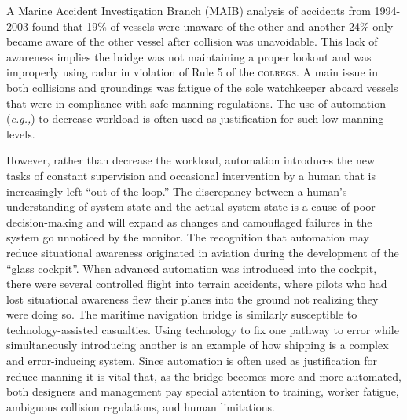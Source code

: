 \documentclass[twoside,symmetric,notoc]{tufte-book}
\newcommand{\hairsp}{\hspace{1pt}}
\newcommand{\eg}{\textit{e.\hairsp{}g.,}\hspace{3pt}}
\begin{document}
\newpage
\par{%
A Marine Accident Investigation Branch (MAIB) analysis of accidents from 1994-2003 found that 19\% of vessels were unaware of the other and another 24\% only became aware of the other vessel after collision was unavoidable. This lack of awareness implies the bridge was not maintaining a proper lookout and was improperly using radar in violation of Rule 5 of the \textsc{colregs}. A main issue in both collisions and groundings was fatigue of the sole watchkeeper aboard vessels that were in compliance with safe manning regulations.\cite{MAIB_2004} The use of automation (\eg{radar, automatic radar plotting aid, automatic identification system, electronic chart display and information system, autopilot}) to decrease workload is often used as justification for such low manning levels.
}
\par{%
However, rather than decrease the workload, automation introduces the new tasks of constant supervision and occasional intervention by a human that is increasingly left ``out-of-the-loop.'' The discrepancy between a human's understanding of system state and the actual system state is a cause of poor decision-making and will expand as changes and camouflaged failures in the system go unnoticed by the monitor.\cite{Woods_1988} The recognition that automation may reduce situational awareness originated in aviation during the development of the ``glass cockpit''. When advanced automation was introduced into the cockpit, there were several controlled flight into terrain accidents, where pilots who had lost situational awareness flew their planes into the ground not realizing they were doing so.\cite{Ishibash} The maritime navigation bridge is similarly susceptible to technology-assisted casualties. Using technology to fix one pathway to error while simultaneously introducing another is an example of how shipping is a complex and error-inducing system. Since automation is often used as justification for reduce manning it is vital that, as the bridge becomes more and more automated, both designers and management pay special attention to training, worker fatigue, ambiguous collision regulations, and human limitations.
}
\end{document}
